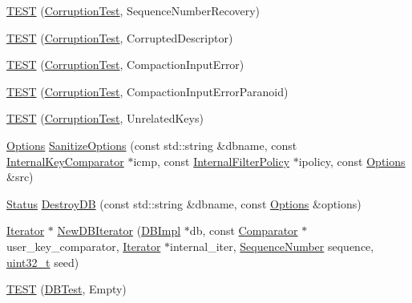 \begin{DoxyCompactItemize}
\item 
\hyperlink{namespaceleveldb_acc1b0ed2e8e9e4e6b930a1727d9fe0f8}{T\+E\+S\+T} (\hyperlink{classleveldb_1_1_corruption_test}{Corruption\+Test}, Sequence\+Number\+Recovery)
\item 
\hyperlink{namespaceleveldb_ab52c022fc16dd83fe1c1c60745c9557c}{T\+E\+S\+T} (\hyperlink{classleveldb_1_1_corruption_test}{Corruption\+Test}, Corrupted\+Descriptor)
\item 
\hyperlink{namespaceleveldb_ac45d45675cfba0614b5788177b03e717}{T\+E\+S\+T} (\hyperlink{classleveldb_1_1_corruption_test}{Corruption\+Test}, Compaction\+Input\+Error)
\item 
\hyperlink{namespaceleveldb_a2bb2a098a32d42044e6be132020b29b0}{T\+E\+S\+T} (\hyperlink{classleveldb_1_1_corruption_test}{Corruption\+Test}, Compaction\+Input\+Error\+Paranoid)
\item 
\hyperlink{namespaceleveldb_adbafd76c895bbb400c6aa4ad6e0eae2e}{T\+E\+S\+T} (\hyperlink{classleveldb_1_1_corruption_test}{Corruption\+Test}, Unrelated\+Keys)
\item 
\hyperlink{structleveldb_1_1_options}{Options} \hyperlink{namespaceleveldb_aa4783e598841dca4393a97d360d10f56}{Sanitize\+Options} (const std\+::string \&dbname, const \hyperlink{classleveldb_1_1_internal_key_comparator}{Internal\+Key\+Comparator} $\ast$icmp, const \hyperlink{classleveldb_1_1_internal_filter_policy}{Internal\+Filter\+Policy} $\ast$ipolicy, const \hyperlink{structleveldb_1_1_options}{Options} \&src)
\item 
\hyperlink{classleveldb_1_1_status}{Status} \hyperlink{namespaceleveldb_a5b0819d4d4adc2147b5e91a5553fd7dc}{Destroy\+D\+B} (const std\+::string \&dbname, const \hyperlink{structleveldb_1_1_options}{Options} \&options)
\item 
\hyperlink{classleveldb_1_1_iterator}{Iterator} $\ast$ \hyperlink{namespaceleveldb_a0d4b256207f27afbf4ad03976fe0fae8}{New\+D\+B\+Iterator} (\hyperlink{classleveldb_1_1_d_b_impl}{D\+B\+Impl} $\ast$db, const \hyperlink{structleveldb_1_1_comparator}{Comparator} $\ast$user\+\_\+key\+\_\+comparator, \hyperlink{classleveldb_1_1_iterator}{Iterator} $\ast$internal\+\_\+iter, \hyperlink{namespaceleveldb_a5481ededd221c36d652c371249f869fa}{Sequence\+Number} sequence, \hyperlink{stdint_8h_a435d1572bf3f880d55459d9805097f62}{uint32\+\_\+t} seed)
\item 
\hyperlink{namespaceleveldb_a5cdb2a977033415260acc09b4b1b7171}{T\+E\+S\+T} (\hyperlink{classleveldb_1_1_d_b_test}{D\+B\+Test}, Empty)
\item 

\end{DoxyCompactItemize}
